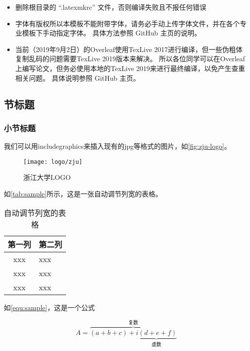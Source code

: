 \begin{itemize}
    \item 删除根目录的 ``.latexmkrc'' 文件，否则编译失败且不报任何错误
    \item 字体有版权所以本模板不能附带字体，请务必手动上传字体文件，并在各个专业模板下手动指定字体。
        具体方法参照 GitHub 主页的说明。
    \item 当前（2019年9月2日）的Overleaf使用TexLive 2017进行编译，但一些伪粗体复制乱码的问题需要TexLive 2019版本来解决。
        所以各位同学可以在Overleaf上编写论文，但务必使用本地的TexLive 2019来进行最终编译，以免产生查重相关问题。
        具体说明参照 GitHub 主页。
\end{itemize}

\subsection{节标题}

\subsubsection{小节标题}

\par 我们可以用includegraphics来插入现有的jpg等格式的图片，如\autoref{fig:zju-logo}。

\begin{figure}[ht]
    \centering
    \texttt{[image: logo/zju]}
    \caption{\label{fig:zju-logo}浙江大学LOGO}
\end{figure}

\par 如\autoref{tab:sample}所示，这是一张自动调节列宽的表格。

\begin{table}[ht]
    \caption{\label{tab:sample}自动调节列宽的表格}
    \begin{tabularx}{\linewidth}{|c|X<{\centering}|}
        \hline
        第一列 & 第二列 \\ \hline
        xxx & xxx \\ \hline
        xxx & xxx \\ \hline
        xxx & xxx \\ \hline
    \end{tabularx}
\end{table}

\par 如\autoref{equ:sample}，这是一个公式

\begin{equation}
    \label{equ:sample}
    A=\overbrace{(a+b+c)+\underbrace{i(d+e+f)}_{\text{虚数}}}^{\text{复数}}
\end{equation}


